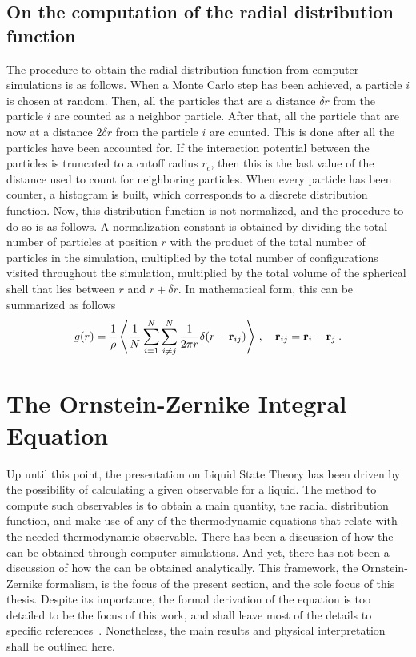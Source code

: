 \subsection{On the computation of the radial distribution function}
The procedure to obtain the radial distribution function from computer simulations is as
follows. When a Monte Carlo step has been achieved, a particle $i$ is chosen at random.
Then, all the particles that are a distance $\delta r$ from the particle $i$ are counted
as a neighbor particle. After that, all the particle that are now at a distance
$2 \delta r$ from the particle $i$ are counted. This is done after all the particles
have been accounted for. If the interaction potential between the particles is truncated
to a cutoff radius $r_c$, then this is the last value of the distance used to count
for neighboring particles. When every particle has been counter, a histogram is built,
which corresponds to a discrete distribution function. Now, this distribution function is
not normalized, and the procedure to do so is as follows. A normalization constant is 
obtained by dividing the total number of particles at position $r$ with the product
of the total number of particles in the simulation, multiplied by the total number of
configurations visited throughout the simulation, multiplied by the total volume of the
spherical shell that lies between $r$ and $r + \delta r$.
In mathematical form, this can be summarized as follows
\begin{equation}
    g(r)=\frac{1}{\rho} \left\langle \frac{1}{N} \sum_{i=1}^{N} \sum_{i \neq j}^{N} 
    \frac{1}{2 \pi r} \delta (r - \mathbf{r}_{ij}) \right\rangle
    \, , \quad
    \mathbf{r}_{ij}=\mathbf{r}_{i} - \mathbf{r}_{j} \: .
    \label{eq:rdf-simulation}
\end{equation}

\section{The Ornstein-Zernike Integral Equation}
Up until this point, the presentation on Liquid State Theory has been driven by the
possibility of calculating a given observable for a liquid. The method to compute such
observables is to obtain a main quantity, the radial distribution function, and
make use of any of the thermodynamic equations that relate \rdf with the needed
thermodynamic observable. There has been a discussion of how the \rdf can be obtained
through computer simulations. And yet, there has not been a discussion of how the \rdf
can be obtained analytically. This framework, the Ornstein-Zernike formalism,
is the focus of the present section, and the sole focus of this thesis. Despite its
importance, the formal derivation of the equation is too detailed to be the focus of
this work, and shall leave most of the details to specific references~\cite{hansenTheorySimpleLiquids2013}.
Nonetheless, the main results and physical interpretation shall be outlined here.

